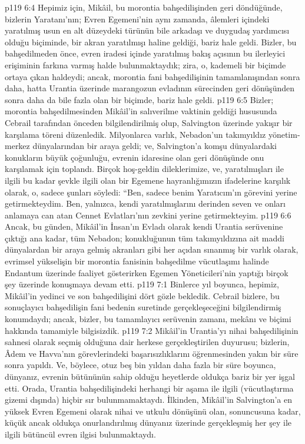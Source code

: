 \vs p119 6:4 Hepimiz için, Mikâil, bu morontia bahşedilişinden geri döndüğünde, bizlerin Yaratanı’nın; Evren Egemeni’nin aynı zamanda, âlemleri içindeki yaratılmış usun en alt düzeydeki türünün bile arkadaşı ve duygudaş yardımcısı olduğu biçiminde, bir akran yaratılmışı haline geldiği, bariz hale geldi. Bizler, bu bahşedilmeden önce, evren iradesi içinde yaratılmış bakış açısının bu ilerleyici erişiminin farkına varmış halde bulunmaktaydık; zira, o, kademeli bir biçimde ortaya çıkan haldeydi; ancak, morontia fani bahşedilişinin tamamlanışından sonra daha, hatta Urantia üzerinde marangozun evladının sürecinden geri dönüşünden sonra daha da bile fazla olan bir biçimde, bariz hale geldi.
\vs p119 6:5 Bizler; morontia bahşedilmesinden Mikâil’in salıverilme vaktinin geldiği hususunda Cebrail tarafından önceden bilgilendirilmiş olup, Salvington üzerinde yakışır bir karşılama töreni düzenledik. Milyonlarca varlık, Nebadon’un takımyıldız yönetim\hyp{}merkez dünyalarından bir araya geldi; ve, Salvington’a komşu dünyalardaki konukların büyük çoğunluğu, evrenin idaresine olan geri dönüşünde onu karşılamak için toplandı. Birçok hoş\hyp{}geldin dileklerimize, ve, yaratılmışları ile ilgili bu kadar şevkle ilgili olan bir Egemene hayranlığımızın ifadelerine karşılık olarak, o, sadece şunları söyledi: “Ben, sadece benim Yaratıcım’ın görevini yerine getirmekteydim. Ben, yalnızca, kendi yaratılmışlarını derinden seven ve onları anlamaya can atan Cennet Evlatları’nın zevkini yerine getirmekteyim.
\vs p119 6:6 Ancak, bu günden, Mikâil’in İnsan’ın Evladı olarak kendi Urantia serüvenine çıktığı ana kadar, tüm Nebadon; konukluğunun tüm takımyıldızına ait maddi dünyalardan bir araya gelmiş akranları gibi her açıdan sınanmış bir varlık olarak, evrimsel yükselişin bir morontia fanisinin bahşedilme vücutlaşımı halinde Endantum üzerinde faaliyet gösterirken Egemen Yöneticileri’nin yaptığı birçok şey üzerinde konuşmaya devam etti.
\vs p119 7:1 Binlerce yıl boyunca, hepimiz, Mikâil’in yedinci ve son bahşedilişini dört gözle bekledik. Cebrail bizlere, bu sonuçlayıcı bahşedilişin fani bedenin suretinde gerçekleşeceğini bilgilendirmiş konumdaydı; ancak, bizler, bu tamamlayıcı serüvenin zamanı, mekânı ve biçimi hakkında tamamiyle bilgisizdik.
\vs p119 7:2 Mikâil’in Urantia’yı nihai bahşedilişinin sahnesi olarak seçmiş olduğuna dair herkese gerçekleştirilen duyurusu; bizlerin, Âdem ve Havva’nın görevlerindeki başarısızlıklarını öğrenmesinden yakın bir süre sonra yapıldı. Ve, böylece, otuz beş bin yıldan daha fazla bir süre boyunca, dünyanız, evrenin bütününün sahip olduğu heyetlerde oldukça bariz bir yer işgal etti. Orada, Urantia bahşedilişindeki herhangi bir aşama ile ilgili (vücutlaştırma gizemi dışında) hiçbir sır bulunmamaktaydı. İlkinden, Mikâil’in Salvington’a en yüksek Evren Egemeni olarak nihai ve utkulu dönüşünü olan, sonuncusuna kadar, küçük ancak oldukça onurlandırılmış dünyanız üzerinde gerçekleşmiş her şey ile ilgili bütüncül evren ilgisi bulunmaktaydı.
